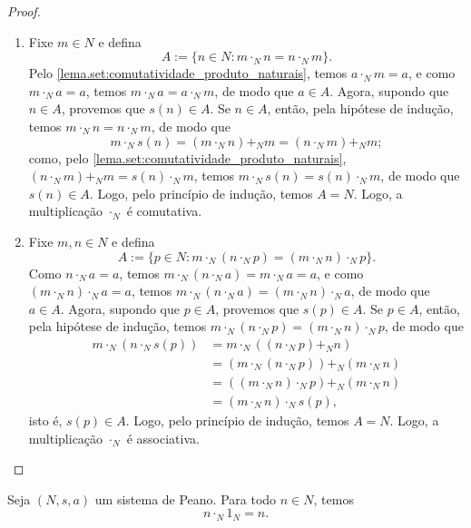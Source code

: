 \begin{proof}
    \leavevmode
        \begin{enumerate}[leftmargin=*, align=left, label=\textbf{(\alph*)}]
            \item Fixe $m \in N$ e defina
                \[
                    A := \{n \in N : m \cdot_N n = n \cdot_N m \}.
                \]
            Pelo \cref{lema.set:comutatividade_produto_naturais}, temos $a \cdot_N m = a$, e como $m \cdot_N a = a$, temos $m \cdot_N a = a \cdot_N m$, de modo que $a \in A$. Agora, supondo que $n \in A$, provemos que $s(n) \in A$. Se $n \in A$, então, pela hipótese de indução, temos $m \cdot_N n = n \cdot_N m$, de modo que
                \[
                    m \cdot_N s(n) = (m \cdot_N n) +_N m = (n \cdot_N m) +_N m;
                \]
            como, pelo \cref{lema.set:comutatividade_produto_naturais}, $(n \cdot_N m) +_N m = s(n) \cdot_N m$, temos $m \cdot_N s(n) = s(n) \cdot_N m$, de modo que $s(n) \in A$. Logo, pelo princípio de indução, temos $A = N$. Logo, a multiplicação $\cdot_N$ é comutativa. \blackproof
            \item Fixe $m,n \in N$ e defina
                \[
                    A := \{p \in N : m \cdot_N (n \cdot_N p) = (m \cdot_N n) \cdot_N p\}.
                \]
            Como $n \cdot_N a = a$, temos $m \cdot_N (n \cdot_N a) = m \cdot_N a = a$, e como $(m \cdot_N n) \cdot_N a = a$, temos $m \cdot_N (n \cdot_N a) = (m \cdot_N n) \cdot_N a$, de modo que $a \in A$. Agora, supondo que $p \in A$, provemos que $s(p) \in A$. Se $p \in A$, então, pela hipótese de indução, temos $m \cdot_N (n \cdot_N p) = (m \cdot_N n) \cdot_N p$, de modo que
                \begin{align*}
                    m \cdot_N (n \cdot_N s(p)) &= m \cdot_N ((n \cdot_N p) +_N n) \\
                    &= (m \cdot_N (n \cdot_N p)) +_N (m \cdot_N n) \\
                    &= ((m \cdot_N n) \cdot_N p) +_N (m \cdot_N n) \\
                    &= (m \cdot_N n) \cdot_N s(p),
                \end{align*}
            isto é, $s(p) \in A$. Logo, pelo princípio de indução, temos $A = N$. Logo, a multiplicação $\cdot_N$ é associativa. \blackproof
        \end{enumerate}
\end{proof}

\begin{proposition}
    Seja $(N,s,a)$ um sistema de Peano. Para todo $n \in N$, temos
        \[
            n \cdot_N 1_N = n.
        \]
\end{proposition}

